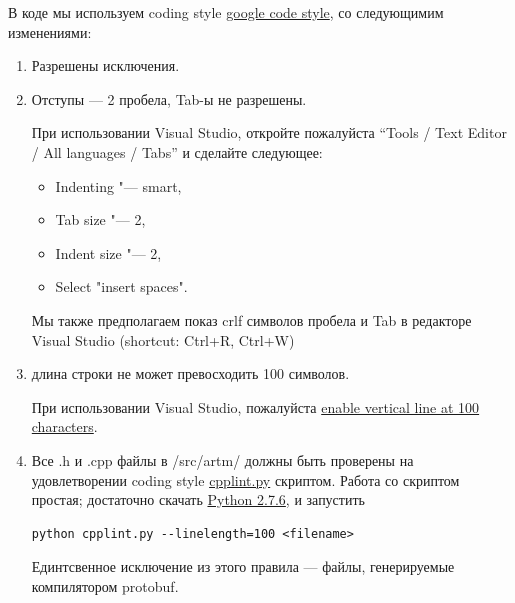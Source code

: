 \documentclass[12pt]{article}
\begin{document}
В коде мы используем coding style
\href{http://google-styleguide.googlecode.com/svn/trunk/cppguide.xml}{google code style},
со следующимим изменениями:
\begin{enumerate}
    \item Разрешены исключения.
    \item Отступы --- 2 пробела, Tab-ы не разрешены.

      При использовании Visual Studio,
      откройте пожалуйста ``Tools / Text Editor / All languages / Tabs''
      и сделайте следующее:
      \begin{itemize}
          \item Indenting "--- smart,
          \item Tab size "--- 2,
          \item Indent size "--- 2,
          \item Select "insert spaces".
      \end{itemize}

      Мы также предполагаем показ crlf символов пробела и Tab
      в редакторе Visual Studio (shortcut: Ctrl+R, Ctrl+W)

\item длина строки не может превосходить 100 символов.

      При использовании Visual Studio, пожалуйста \href{http://stackoverflow.com/questions/9894397/100-characters-line-marker-in-visual-studio}{enable
       vertical line at 100 characters}.

\item Все .h и .cpp файлы в /src/artm/ должны быть проверены на удовлетворении coding style 
      \href{http://google-styleguide.googlecode.com/svn/trunk/cpplint/cpplint.py}{cpplint.py} скриптом.
      Работа со скриптом простая; достаточно скачать
      \href{http://www.python.org/downloads/}{Python 2.7.6}, и запустить 

\begin{verbatim}
python cpplint.py --linelength=100 <filename>
\end{verbatim}
      Единтсвенное исключение из этого правила --- файлы, генерируемые компилятором protobuf.
      
\end{enumerate}
\end{document}
